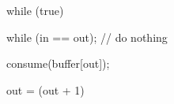 \documentclass[varwidth=19em,crop]{standalone}
\begin{document}
\begin{ccode}
while (true) {
  while (in == out); // do nothing

  consume(buffer[out]);

  out = (out + 1) %
}
\end{ccode}
\end{document}

